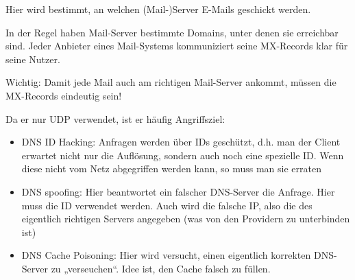 
Hier wird bestimmt, an welchen (Mail-)Server E-Mails geschickt werden.

In der Regel haben Mail-Server bestimmte Domains, unter denen sie erreichbar sind.
Jeder Anbieter eines Mail-Systems kommuniziert seine MX-Records klar für seine Nutzer.

Wichtig: Damit jede Mail auch am richtigen Mail-Server ankommt, müssen die MX-Records eindeutig sein!

Da er nur UDP verwendet, ist er häufig Angriffsziel:
\begin{itemize}
    \item DNS ID Hacking: Anfragen werden über IDs geschützt, d.h. man der Client erwartet nicht nur die Auflösung, sondern auch noch eine spezielle ID. Wenn diese nicht vom Netz abgegriffen werden kann, so muss man sie erraten
    \item DNS spoofing: Hier beantwortet ein falscher DNS-Server die Anfrage.
    Hier muss die ID verwendet werden. Auch wird die falsche IP, also die des eigentlich richtigen Servers angegeben (was von den Providern zu unterbinden ist)
    \item DNS Cache Poisoning: Hier wird versucht, einen eigentlich korrekten DNS-Server zu „verseuchen“.
    Idee ist, den Cache falsch zu füllen.
\end{itemize}